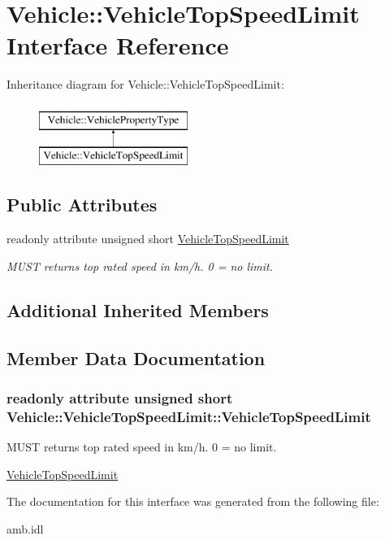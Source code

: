 \hypertarget{interfaceVehicle_1_1VehicleTopSpeedLimit}{\section{Vehicle\-:\-:Vehicle\-Top\-Speed\-Limit Interface Reference}
\label{interfaceVehicle_1_1VehicleTopSpeedLimit}
}
Inheritance diagram for Vehicle\-:\-:Vehicle\-Top\-Speed\-Limit\-:\begin{figure}[H]
\begin{center}
\leavevmode
\includegraphics[height=2.000000cm]{interfaceVehicle_1_1VehicleTopSpeedLimit}
\end{center}
\end{figure}
\subsection*{Public Attributes}
\begin{DoxyCompactItemize}
\item 
readonly attribute unsigned short \hyperlink{interfaceVehicle_1_1VehicleTopSpeedLimit_a04da9c90ab1a1c5b5b0122927c7775e2}{Vehicle\-Top\-Speed\-Limit}
\begin{DoxyCompactList}\small\item\em M\-U\-S\-T returns top rated speed in km/h. 0 = no limit. \end{DoxyCompactList}\end{DoxyCompactItemize}
\subsection*{Additional Inherited Members}


\subsection{Member Data Documentation}
\hypertarget{interfaceVehicle_1_1VehicleTopSpeedLimit_a04da9c90ab1a1c5b5b0122927c7775e2}{
\subsubsection[{Vehicle\-Top\-Speed\-Limit}]{\setlength{\rightskip}{0pt plus 5cm}readonly attribute unsigned short Vehicle\-::\-Vehicle\-Top\-Speed\-Limit\-::\-Vehicle\-Top\-Speed\-Limit}}\label{interfaceVehicle_1_1VehicleTopSpeedLimit_a04da9c90ab1a1c5b5b0122927c7775e2}


M\-U\-S\-T returns top rated speed in km/h. 0 = no limit. 

\hyperlink{interfaceVehicle_1_1VehicleTopSpeedLimit}{Vehicle\-Top\-Speed\-Limit} 

The documentation for this interface was generated from the following file\-:\begin{DoxyCompactItemize}
\item 
amb.\-idl\end{DoxyCompactItemize}
